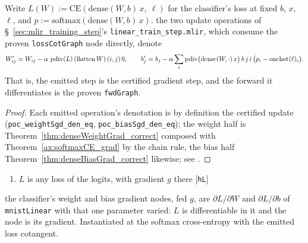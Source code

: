 \begin{theorem}
  \label{thm:linear_fold}
  \leanok
  Write \(L(W) := \mathrm{CE}(\mathrm{dense}(W, b)\, x,\ \ell)\) for the
  classifier's loss at fixed \(b\), \(x\), \(\ell\), and
  \(p := \mathrm{softmax}(\mathrm{dense}(W, b)\, x)\).
  \Prove{} the two update operations of
  \S~\ref{sec:mlir_training_step}'s \texttt{linear\_train\_step.mlir},
  which consume the proven \texttt{lossCotGraph} node directly, denote
  \[
    W'_{ij} = W_{ij} - \alpha\,\operatorname{pdiv}(L)\,(\mathrm{flatten}\, W)\,(i,j)\,0,
    \qquad
    b'_j = b_j - \alpha \sum_i
      \operatorname{pdiv}\bigl(\mathrm{dense}(W, \cdot)\, x\bigr)\, b\, j\, i
      \,\bigl(p_i - \mathrm{onehot}(\ell)_i\bigr).
  \]
  That is, the emitted step is the certified gradient step, and the
  forward it differentiates is the proven \texttt{fwdGraph}.
\end{theorem}

\begin{proof}
\leanok
Each emitted operation's denotation is by definition the certified
update (\texttt{poc\_weightSgd\_den\_eq}, \texttt{poc\_biasSgd\_den\_eq});
the weight half is Theorem~\ref{thm:denseWeightGrad_correct} composed
with Theorem~\ref{ax:softmaxCE_grad} by the chain rule, the bias half
Theorem~\ref{thm:denseBiasGrad_correct} likewise; see
.
\end{proof}

\begin{theorem}
  \label{thm:linear_loss_grad}
  \leanok
  \Assume{}
  \begin{enumerate}
    \item \(L\) is any loss of the logits, with gradient \(g\) there
          \hfill[\texttt{hL}]
  \end{enumerate}
  \Prove{} the classifier's weight and bias gradient nodes, fed \(g\), are
  \(\partial L/\partial W\) and \(\partial L/\partial b\) of
  \texttt{mnistLinear} with that one parameter varied: \(L\) is differentiable
  in it and the node is its gradient. Instantiated at the softmax
  cross-entropy with the emitted loss cotangent.
\end{theorem}

